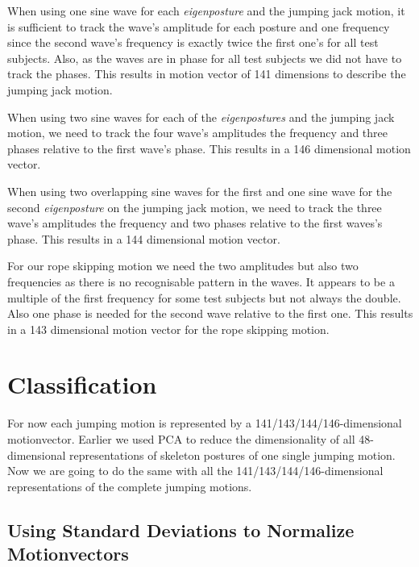 \documentclass[a4paper]{article}
\begin{document}
When using one sine wave for each \emph{eigenposture} and the jumping jack motion, it is sufficient to track the wave's amplitude for each posture and one frequency since the second wave's frequency is exactly twice the first one's for all test subjects.
Also, as the waves are in phase for all test subjects we did not have to track the phases.
This results in motion vector of 141 dimensions to describe the jumping jack motion.

When using two sine waves for each of the \emph{eigenpostures} and the jumping jack motion, we need to track the four wave's amplitudes the frequency and three phases relative to the first wave's phase.
This results in a 146 dimensional motion vector.

When using two overlapping sine waves for the first and one sine wave for the second \emph{eigenposture} on the jumping jack motion, we need to track the three wave's amplitudes the frequency and two phases relative to the first waves's phase.
This results in a 144 dimensional motion vector.

For our rope skipping motion we need the two amplitudes but also two frequencies as there is no recognisable pattern in the waves.
It appears to be a multiple of the first frequency for some test subjects but not always the double.
Also one phase is needed for the second wave relative to the first one.
This results in a 143 dimensional motion vector for the rope skipping motion.



\section{Classification}

For now each jumping motion is represented by a 141/143/144/146-dimensional motionvector.
Earlier we used PCA to reduce the dimensionality of all 48-dimensional representations of skeleton postures of one single jumping motion.
Now we are going to do the same with all the 141/143/144/146-dimensional representations of the complete jumping motions.

\subsection{Using Standard Deviations to Normalize Motionvectors}
\end{document}
